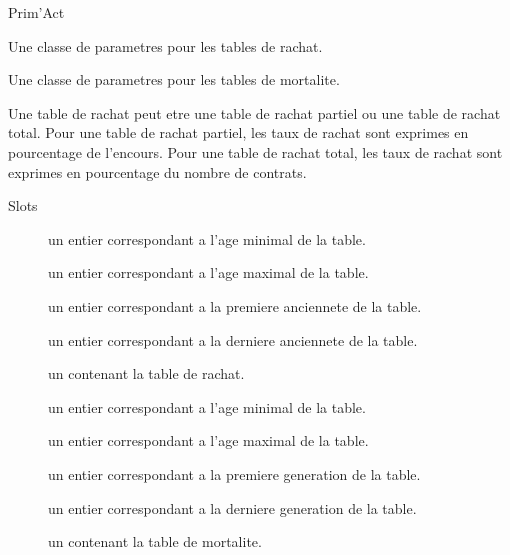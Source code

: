 \documentclass[a4paper]{book}
\begin{document}
%
\begin{Author}\relax
Prim'Act
\end{Author}
%
\begin{Description}\relax
Une classe de parametres pour les tables de rachat.

Une classe de parametres pour les tables de mortalite.
\end{Description}
%
\begin{Details}\relax
Une table de rachat peut etre une table de rachat partiel ou une table de rachat total.
Pour une table de rachat partiel, les taux de rachat sont exprimes en pourcentage de l'encours.
Pour une table de rachat total, les taux de rachat sont exprimes en pourcentage du nombre de contrats.
\end{Details}
%
\begin{Section}{Slots}

\begin{description}

\item[] un entier correspondant a l'age minimal de la table.

\item[] un entier correspondant a l'age maximal de la table.

\item[] un entier correspondant a la premiere anciennete de la table.

\item[] un entier correspondant a la derniere anciennete de la table.

\item[] un  contenant la table de rachat.

\item[] un entier correspondant a l'age minimal de la table.

\item[] un entier correspondant a l'age maximal de la table.

\item[] un entier correspondant a la premiere generation de la table.

\item[] un entier correspondant a la derniere generation de la table.

\item[] un  contenant la table de mortalite.

\end{description}
\end{Section}
\end{document}
